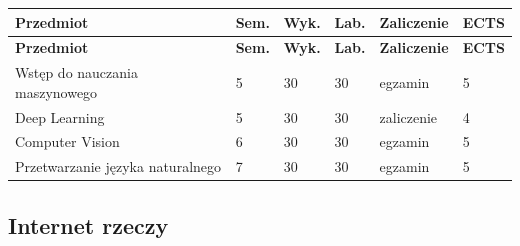 \documentclass[12pt,a4paper]{article}
\newcommand{\thdrule}{\noalign{\global\setlength{\extrarowheight}{0pt}}}
\newcommand{\thdend}{\noalign{\global\setlength{\extrarowheight}{4pt}}}
\begin{document}
{\scriptsize
\begin{longtable}{m{6.5cm}m{0.7cm}m{1cm}m{1cm}m{1.7cm}m{0.7cm}}
\thdrule\toprule
\rowcolor{pjatkRed}
{\color{white}\footnotesize\textbf{\vphantom{Ag}Przedmiot}} & {\color{white}\footnotesize\textbf{\vphantom{Ag}Sem.}} & {\color{white}\footnotesize\textbf{\vphantom{Ag}Wyk.}} & {\color{white}\footnotesize\textbf{\vphantom{Ag}Lab.}} & {\color{white}\footnotesize\textbf{\vphantom{Ag}Zaliczenie}} & {\color{white}\footnotesize\textbf{\vphantom{Ag}ECTS}} \\
\midrule\thdend
\endfirsthead
\thdrule\toprule
\rowcolor{pjatkRed}
{\color{white}\footnotesize\textbf{\vphantom{Ag}Przedmiot}} & {\color{white}\footnotesize\textbf{\vphantom{Ag}Sem.}} & {\color{white}\footnotesize\textbf{\vphantom{Ag}Wyk.}} & {\color{white}\footnotesize\textbf{\vphantom{Ag}Lab.}} & {\color{white}\footnotesize\textbf{\vphantom{Ag}Zaliczenie}} & {\color{white}\footnotesize\textbf{\vphantom{Ag}ECTS}} \\
\midrule\thdend
\endhead
\rowcolor{tableRowLight} Wstęp do nauczania maszynowego & 5 & 30 & 30 & {\scriptsize egzamin} & 5 \\
\rowcolor{tableRowAlt} Deep Learning & 5 & 30 & 30 & {\scriptsize zaliczenie} & 4 \\
\rowcolor{tableRowLight} Computer Vision & 6 & 30 & 30 & {\scriptsize egzamin} & 5 \\
\rowcolor{tableRowAlt} Przetwarzanie języka naturalnego & 7 & 30 & 30 & {\scriptsize egzamin} & 5 \\
\bottomrule
\end{longtable}}

\subsection*{Internet rzeczy}
\end{document}
